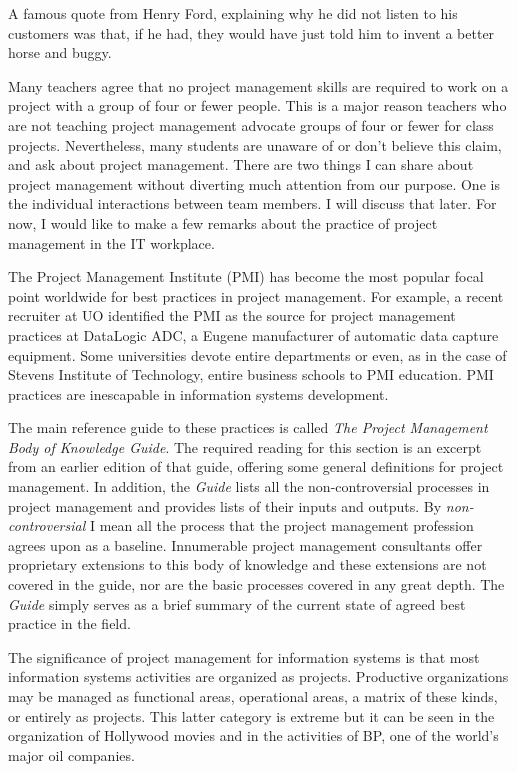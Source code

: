 A famous quote from Henry Ford, explaining why he did not listen to his
customers was that, if he had, they would have just told him to invent a
better horse and buggy.

\hypertarget{project-management}{%
\label{project-management}}

Many teachers agree that no project management skills are required to
work on a project with a group of four or fewer people. This is a major
reason teachers who are not teaching project management advocate groups
of four or fewer for class projects. Nevertheless, many students are
unaware of or don't believe this claim, and ask about project
management. There are two things I can share about project management
without diverting much attention from our purpose. One is the individual
interactions between team members. I will discuss that later. For now, I
would like to make a few remarks about the practice of project
management in the IT workplace.

The Project Management Institute (PMI) has become the most popular focal
point worldwide for best practices in project management. For example, a
recent recruiter at UO identified the PMI as the source for project
management practices at DataLogic ADC, a Eugene manufacturer of
automatic data capture equipment. Some universities devote entire
departments or even, as in the case of Stevens Institute of Technology,
entire business schools to PMI education. PMI practices are inescapable
in information systems development.

The main reference guide to these practices is called \emph{The Project
Management Body of Knowledge Guide}. The required reading for this
section is an excerpt from an earlier edition of that guide, offering
some general definitions for project management. In addition, the
\emph{Guide} lists all the non-controversial processes in project
management and provides lists of their inputs and outputs. By
\emph{non-controversial} I mean all the process that the project
management profession agrees upon as a baseline. Innumerable project
management consultants offer proprietary extensions to this body of
knowledge and these extensions are not covered in the guide, nor are the
basic processes covered in any great depth. The \emph{Guide} simply
serves as a brief summary of the current state of agreed best practice
in the field.

The significance of project management for information systems is that
most information systems activities are organized as projects.
Productive organizations may be managed as functional areas, operational
areas, a matrix of these kinds, or entirely as projects. This latter
category is extreme but it can be seen in the organization of Hollywood
movies and in the activities of BP, one of the world's major oil
companies.

